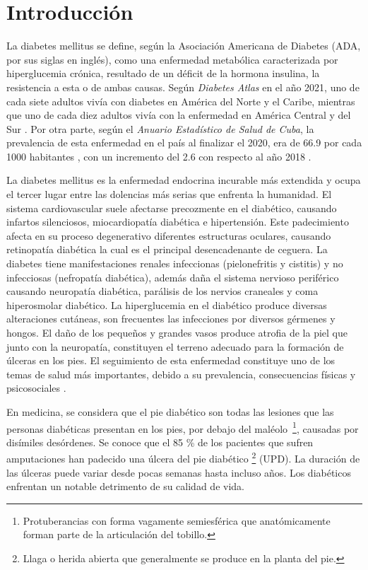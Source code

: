 \chapter*{Introducción}\label{chapter:introduction}

La diabetes mellitus se define, según la Asociación Americana de Diabetes (ADA, por sus siglas en inglés), como una enfermedad metabólica caracterizada por hiperglucemia crónica, resultado de un déficit de la hormona insulina, la resistencia a esta o de ambas causas. Según \textit{Diabetes Atlas} en el año 2021, uno de cada siete adultos vivía con diabetes en América del Norte y el Caribe, mientras que uno de cada diez adultos vivía con la enfermedad en América Central y del Sur \cite{diabetesAtlas}. Por otra parte, según el \textit{Anuario Estadístico de Salud de Cuba}, la prevalencia de esta enfermedad en el país al finalizar el 2020, era de 66.9 por cada 1000 habitantes \cite{anuario2020}, con un incremento del 2.6 con respecto al año 2018 \cite{anuario2018}.

La diabetes mellitus es la enfermedad endocrina incurable más extendida y ocupa el tercer lugar entre las dolencias más serias que enfrenta la humanidad. El sistema cardiovascular suele afectarse precozmente en el diabético, causando infartos silenciosos, miocardiopatía diabética e hipertensión. Este padecimiento afecta en su proceso degenerativo diferentes estructuras oculares, causando retinopatía diabética la cual es el principal desencadenante de ceguera. La diabetes tiene manifestaciones renales infeccionas (pielonefritis y cistitis) y no infecciosas (nefropatía diabética), además daña el sistema nervioso periférico causando neuropatía diabética, parálisis de los nervios craneales y coma hiperosmolar diabético. La hiperglucemia en el diabético produce diversas alteraciones cutáneas, son frecuentes las infecciones por diversos gérmenes y hongos. El daño de los pequeños y grandes vasos produce atrofia de la piel que junto con la neuropatía, constituyen el terreno adecuado para la formación de úlceras en los pies. El seguimiento de esta enfermedad constituye uno de los temas de salud más importantes, debido a su prevalencia, consecuencias físicas y psicosociales \cite{roca}.

En medicina, se considera que el pie diabético son todas las lesiones que las personas diabéticas presentan en los pies, por debajo del maléolo~\footnote{Protuberancias con forma vagamente semiesférica que anatómicamente forman parte de la articulación del tobillo.}, causadas por disímiles desórdenes. Se conoce que el 85 \% de los pacientes que sufren amputaciones han padecido una úlcera del pie diabético \footnote{Llaga o herida abierta que generalmente se produce en la planta del pie.} (UPD). La duración de las úlceras puede variar desde pocas semanas hasta incluso años. Los diabéticos enfrentan un notable detrimento de su calidad de vida. 

